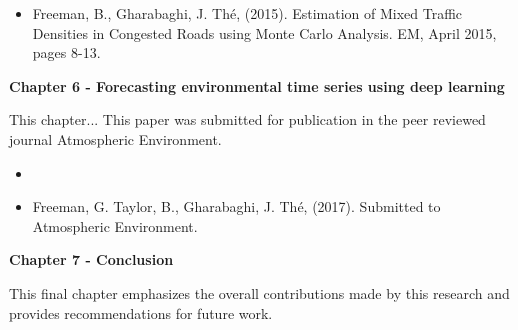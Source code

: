 \begin{itemize}
\item Freeman, B., Gharabaghi, J.  Th\'e, (2015). Estimation of Mixed Traffic Densities in Congested Roads using Monte Carlo Analysis. EM, April 2015, pages 8-13. 
\end{itemize}

\noindent \textbf{Chapter 6 - Forecasting environmental time series using deep learning}

This chapter...  This paper was submitted for publication in the peer reviewed journal Atmospheric Environment.

\begin{itemize}
\item \item Freeman, G. Taylor, B., Gharabaghi, J.  Th\'e, (2017). Submitted to Atmospheric Environment.
\end{itemize}

\noindent \textbf{Chapter 7 - Conclusion}

This final chapter emphasizes the overall contributions made by this research and provides recommendations for future work.



